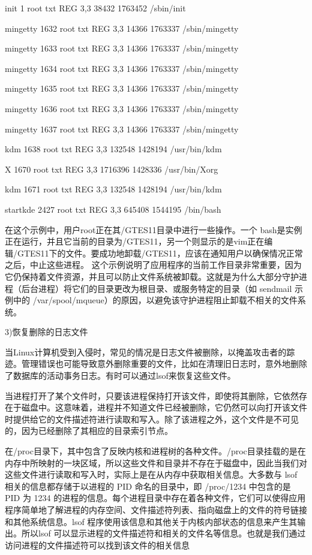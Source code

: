 \documentclass[letterpaper,10pt]{sphinxmanual}
\begin{document}
init       1    root txt       REG    3,3   38432 1763452 /sbin/init

mingetty  1632 root txt       REG    3,3   14366 1763337 /sbin/mingetty

mingetty  1633 root txt       REG    3,3   14366 1763337 /sbin/mingetty

mingetty  1634 root txt       REG    3,3   14366 1763337 /sbin/mingetty

mingetty  1635 root txt       REG    3,3   14366 1763337 /sbin/mingetty

mingetty  1636 root txt       REG    3,3   14366 1763337 /sbin/mingetty

mingetty  1637 root txt       REG    3,3   14366 1763337 /sbin/mingetty

kdm        1638 root txt       REG    3,3  132548 1428194 /usr/bin/kdm

X          1670 root txt       REG    3,3 1716396 1428336 /usr/bin/Xorg

kdm        1671 root txt       REG    3,3  132548 1428194 /usr/bin/kdm

startkde  2427 root txt       REG    3,3  645408 1544195 /bin/bash

在这个示例中，用户root正在其/GTES11目录中进行一些操作。一个 bash是实例正在运行，并且它当前的目录为/GTES11，另一个则显示的是vim正在编辑/GTES11下的文件。要成功地卸载/GTES11，应该在通知用户以确保情况正常之后，中止这些进程。 这个示例说明了应用程序的当前工作目录非常重要，因为它仍保持着文件资源，并且可以防止文件系统被卸载。这就是为什么大部分守护进程（后台进程）将它们的目录更改为根目录、或服务特定的目录（如 sendmail 示例中的 /var/spool/mqueue）的原因，以避免该守护进程阻止卸载不相关的文件系统。

3)恢复删除的日志文件

当Linux计算机受到入侵时，常见的情况是日志文件被删除，以掩盖攻击者的踪迹。管理错误也可能导致意外删除重要的文件，比如在清理旧日志时，意外地删除了数据库的活动事务日志。有时可以通过lsof来恢复这些文件。

当进程打开了某个文件时，只要该进程保持打开该文件，即使将其删除，它依然存在于磁盘中。这意味着，进程并不知道文件已经被删除，它仍然可以向打开该文件时提供给它的文件描述符进行读取和写入。除了该进程之外，这个文件是不可见的，因为已经删除了其相应的目录索引节点。

在/proc目录下，其中包含了反映内核和进程树的各种文件。/proc目录挂载的是在内存中所映射的一块区域，所以这些文件和目录并不存在于磁盘中，因此当我们对这些文件进行读取和写入时，实际上是在从内存中获取相关信息。大多数与 lsof 相关的信息都存储于以进程的 PID 命名的目录中，即 /proc/1234 中包含的是 PID 为 1234
的进程的信息。每个进程目录中存在着各种文件，它们可以使得应用程序简单地了解进程的内存空间、文件描述符列表、指向磁盘上的文件的符号链接和其他系统信息。lsof 程序使用该信息和其他关于内核内部状态的信息来产生其输出。所以lsof
可以显示进程的文件描述符和相关的文件名等信息。也就是我们通过访问进程的文件描述符可以找到该文件的相关信息
\end{document}
